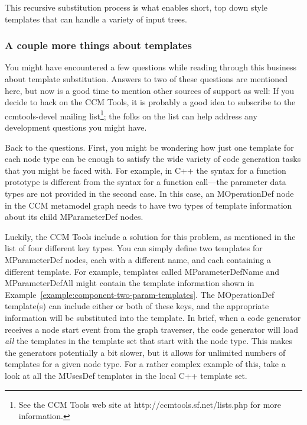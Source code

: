 This recursive substitution process is what enables short, top down style
templates that can handle a variety of input trees.

\subsubsection{A couple more things about templates}
\label{subsubsection:component-multiple-templates}

You might have encountered a few questions while reading through this business
about template substitution. Answers to two of these questions are mentioned
here, but now is a good time to mention other sources of support as well: If you
decide to hack on the CCM Tools, it is probably a good idea to subscribe to the
ccmtools-devel mailing list\footnote{See the CCM Tools web site at
http://ccmtools.sf.net/lists.php for more information.}; the folks on the list
can help address any development questions you might have.

Back to the questions. First, you might be wondering how just one template for
each node type can be enough to satisfy the wide variety of code generation
tasks that you might be faced with. For example, in C++ the syntax for a
function prototype is different from the syntax for a function call---the
parameter data types are not provided in the second case. In this case, an
MOperationDef node in the CCM metamodel graph needs to have two types of
template information about its child MParameterDef nodes.

Luckily, the CCM Tools include a solution for this problem, as mentioned in the
list of four different key types. You can simply define two templates for
MParameterDef nodes, each with a different name, and each containing a different
template. For example, templates called MParameterDefName and MParameterDefAll
might contain the template information shown in
Example~\ref{example:component-two-param-templates}. The MOperationDef
template(s) can include either or both of these keys, and the appropriate
information will be substituted into the template. In brief, when a code
generator receives a node start event from the graph traverser, the code
generator will load {\it all} the templates in the template set that start with
the node type. This makes the generators potentially a bit slower, but it allows
for unlimited numbers of templates for a given node type. For a rather complex
example of this, take a look at all the MUsesDef templates in the local C++
template set.

